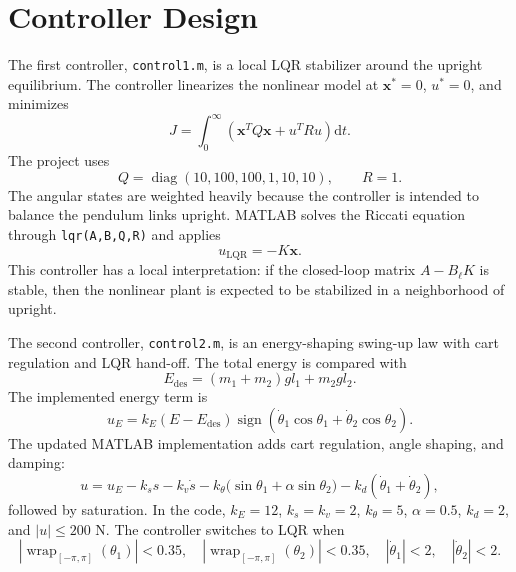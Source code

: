 \documentclass[11pt,a4paper]{article}
\newcommand{\sectionpage}{\clearpage}
\newcommand{\dd}{\mathrm{d}}
\newcommand{\wrap}{\operatorname{wrap}_{[-\pi,\pi]}}
\begin{document}
\sectionpage
\section{Controller Design}

The first controller, \texttt{control1.m}, is a local LQR stabilizer around the upright equilibrium. The controller linearizes the nonlinear model at $\bm x^\ast=0$, $u^\ast=0$, and minimizes
\begin{equation}
    J=\int_0^\infty
    \left(\bm x^{T}Q\bm x+u^{T}Ru\right)\dd t.
\end{equation}
The project uses
\begin{equation}
    Q=\operatorname{diag}(10,100,100,1,10,10),
    \qquad R=1.
\end{equation}
The angular states are weighted heavily because the controller is intended to balance the pendulum links upright. MATLAB solves the Riccati equation through \texttt{lqr(A,B,Q,R)} and applies
\begin{equation}
    u_{\mathrm{LQR}}=-K\bm x.
\end{equation}
This controller has a local interpretation: if the closed-loop matrix $A-B_\ell K$ is stable, then the nonlinear plant is expected to be stabilized in a neighborhood of upright.

The second controller, \texttt{control2.m}, is an energy-shaping swing-up law with cart regulation and LQR hand-off. The total energy is compared with
\begin{equation}
    E_{\mathrm{des}}=(m_1+m_2)gl_1+m_2gl_2.
\end{equation}
The implemented energy term is
\begin{equation}
    u_E=k_E(E-E_{\mathrm{des}})
    \operatorname{sign}\!\left(
    \dot{\theta}_1\cos\theta_1+
    \dot{\theta}_2\cos\theta_2
    \right).
\end{equation}
The updated MATLAB implementation adds cart regulation, angle shaping, and damping:
\begin{equation}
    u = u_E-k_s s-k_v\dot{s}
        -k_{\theta}\bigl(\sin\theta_1+\alpha\sin\theta_2\bigr)
        -k_d(\dot{\theta}_1+\dot{\theta}_2),
\end{equation}
followed by saturation. In the code, $k_E=12$, $k_s=k_v=2$, $k_\theta=5$, $\alpha=0.5$, $k_d=2$, and $|u|\leq200$ N. The controller switches to LQR when
\begin{equation}
    |\wrap(\theta_1)|<0.35,\quad
    |\wrap(\theta_2)|<0.35,\quad
    |\dot{\theta}_1|<2,\quad
    |\dot{\theta}_2|<2.
\end{equation}
\end{document}
